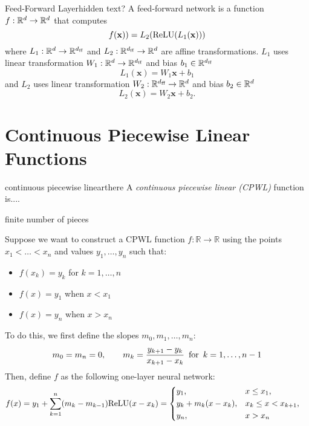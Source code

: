 \begin{definition}{Feed-Forward Layer}{hidden text?}
    A feed-forward network is a function $f:\mathbb{R}^d\to \mathbb{R}^d$ that computes
    \[f(\mathbf{x})) = L_2(\text{ReLU}(L_1(\mathbf{x})))\]
    where $L_1: \mathbb{R}^d \to \mathbb{R}^{d_{\text{ff}}}$ and $L_2: \mathbb{R}^{d_{\text{ff}}} \to \mathbb{R}^{d}$ are affine transformations. $L_1$ uses linear transformation $W_1:\mathbb{R}^d\to \mathbb{R}^{d_{\text{ff}}}$ and bias $b_1\in\mathbb{R}^{d_{\text{ff}}}$
    \[L_1(\mathbf{x}) = W_1 \mathbf{x} + b_1\]
    and $L_2$ uses linear transformation $W_2:\mathbb{R}^{d_{\text{ff}}}\to \mathbb{R}^d$ and bias $b_2\in\mathbb{R}^{d}$
    \[L_2(\mathbf{x}) = W_2 \mathbf{x} + b_2.\]
\end{definition}

\section{Continuous Piecewise Linear Functions}

\begin{definition}{continuous piecewise linear}{there}
A \emph{continuous piecewise linear (CPWL)} function is....

finite number of pieces
\end{definition}

Suppose we want to construct a CPWL function \(f \colon \mathbb{R} \to \mathbb{R}\) using the points \(x_1 < \ldots < x_n\) and values \(y_1, \ldots, y_n\) such that:
\begin{itemize}
    \item \(f(x_k) = y_k\) for \(k = 1, \ldots, n\)
    \item \(f(x) = y_1\) when \(x < x_1\)
    \item \(f(x) = y_n\) when \(x > x_n\)
\end{itemize}
To do this, we first define the slopes \(m_0, m_1, \ldots, m_n\):
\begin{align*}
    m_0 = m_{n} = 0,
    \qquad
    m_k = \frac{y_{k+1} - y_{k}}{x_{k+1} - x_{k}}
    \enskip \text{for} \enskip k = 1, \ldots, n-1
\end{align*}
Then, define \(f\) as the following one-layer neural network:
\begin{align*}
    f(x) &= y_1 + \sum_{k = 1}^{n} (m_{k} - m_{k-1}) \mathrm{ReLU}(x - x_k)
    = \begin{dcases}
        y_1, &x \leq x_1, \\
        y_k + m_{k} (x - x_k), & x_k \leq x < x_{k+1}, \\
        y_n, & x > x_n
    \end{dcases}
\end{align*}

